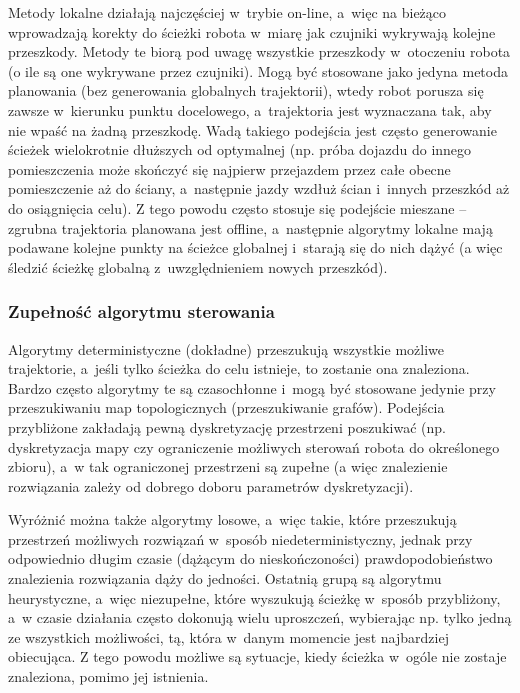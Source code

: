 Metody lokalne działają najczęściej w~trybie on-line, a~więc na bieżąco wprowadzają korekty
do ścieżki robota w~miarę jak czujniki wykrywają kolejne przeszkody. Metody te biorą
pod uwagę wszystkie przeszkody w~otoczeniu robota (o ile są one wykrywane przez czujniki).
Mogą być stosowane jako jedyna metoda planowania (bez generowania globalnych trajektorii),
wtedy robot porusza się zawsze w~kierunku punktu docelowego, a~trajektoria jest wyznaczana
tak, aby nie wpaść na żadną przeszkodę. Wadą takiego podejścia jest często generowanie
ścieżek wielokrotnie dłuższych od optymalnej (np. próba dojazdu do innego pomieszczenia
może skończyć się najpierw przejazdem przez całe obecne pomieszczenie aż do ściany, a~następnie
jazdy wzdłuż ścian i~innych przeszkód aż do osiągnięcia celu). Z tego powodu często
stosuje się podejście mieszane -- zgrubna trajektoria planowana jest offline, a~następnie
algorytmy lokalne mają podawane kolejne punkty na ścieżce globalnej i~starają się do nich
dążyć (a więc śledzić ścieżkę globalną z~uwzględnieniem nowych przeszkód).

\subsubsection{Zupełność algorytmu sterowania}

Algorytmy deterministyczne (dokładne) przeszukują wszystkie możliwe trajektorie,
a~jeśli tylko ścieżka do celu istnieje, to zostanie ona znaleziona. Bardzo często algorytmy
te są czasochłonne i~mogą być stosowane jedynie przy przeszukiwaniu map topologicznych
(przeszukiwanie grafów). Podejścia przybliżone zakładają pewną dyskretyzację przestrzeni
poszukiwać (np. dyskretyzacja mapy czy ograniczenie możliwych sterowań robota do określonego
zbioru), a~w tak ograniczonej przestrzeni są zupełne (a więc znalezienie rozwiązania
zależy od dobrego doboru parametrów dyskretyzacji).

Wyróżnić można także algorytmy losowe, a~więc takie, które przeszukują przestrzeń
możliwych rozwiązań w~sposób niedeterministyczny, jednak przy odpowiednio długim czasie
(dążącym do nieskończoności) prawdopodobieństwo znalezienia rozwiązania dąży do jedności.
Ostatnią grupą są algorytmu heurystyczne, a~więc niezupełne, które wyszukują ścieżkę
w~sposób przybliżony, a~w czasie działania często dokonują wielu uproszczeń, wybierając
np. tylko jedną ze wszystkich możliwości, tą, która w~danym momencie jest najbardziej
obiecująca. Z tego powodu możliwe są sytuacje, kiedy ścieżka w~ogóle nie zostaje
znaleziona, pomimo jej istnienia.

